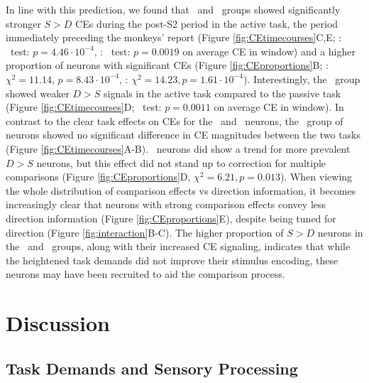 In line with this prediction, we found that \suppressed\ and \consistent\ groups showed significantly stronger $S>D$ CEs during the post-S2 period in the active task, the period immediately preceding the monkeys' report (Figure \ref{fig:CEtimecourses}C,E; \suppressed: \kst\ test: $p=4.46 \cdot 10^{-4}$, \consistent: \kst\ test: $p=0.0019$ on average CE in window) and a higher proportion of neurons with significant CEs (Figure \ref{fig:CEproportions}B; \suppressed: $\chi^2=11.14$, $p=8.43\cdot 10^{-4}$, \consistent: $\chi^2=14.23, p=1.61 \cdot 10^{-4}$).
Interestingly, the \suppressed\ group showed weaker $D>S$ signals in the active task compared to the passive task (Figure \ref{fig:CEtimecourses}D; \kst\ test: $p=0.0011$ on average CE in window).
In contrast to the clear task effects on CEs for the \suppressed\ and \consistent\ neurons, the \enhanced\ group of neurons showed no significant difference in CE magnitudes between the two tasks (Figure \ref{fig:CEtimecourses}A-B). \enhanced\ neurons did show a trend for more prevalent $D>S$ neurons, but this effect did not stand up to correction for multiple comparisons (Figure \ref{fig:CEproportions}D, $\chi^2=6.21, p=0.013$).\label{rev:ceTrend} When viewing the whole distribution of comparison effects vs direction information, it becomes increasingly clear that neurons with strong comparison effects convey less direction information (Figure \ref{fig:CEproportions}E), despite being tuned for direction (Figure \ref{fig:interaction}B-C).
The higher proportion of $S>D$ neurons in the \suppressed\ and \consistent\ groups, along with their increased CE signaling, indicates that while the heightened task demands did not improve their stimulus encoding, these neurons may have been recruited to aid the comparison process.


\section*{\color{sectionBlue} Discussion}
\glsresetall

\subsection*{Task Demands and Sensory Processing}


